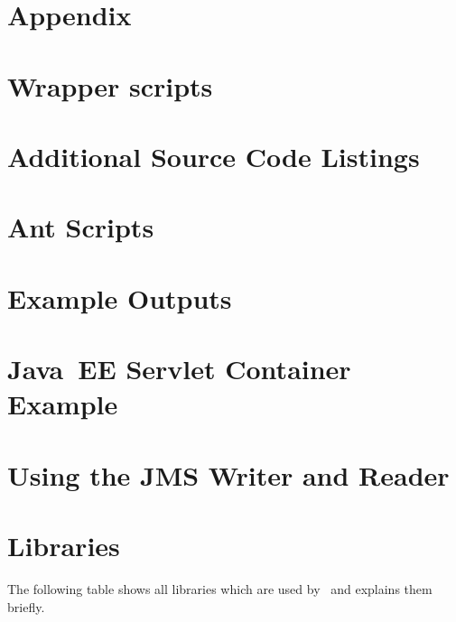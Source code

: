 % 


\appendix

\chapter*{Appendix}\label{appendix}

\chapter{Wrapper scripts}\label{appendix:wrapperScripts}


\chapter{Additional Source Code Listings}\label{appendix:additionalSourceCode}


\chapter{Ant Scripts}\label{appendix:antScripts}


\chapter{Example \KiekerTraceAnalysis{} Outputs}\label{appendix:traceAnalysisOutputExamples}


\chapter{Java~EE Servlet Container Example}\label{appendix:JavaEEServletExample}


\chapter{Using the JMS Writer and Reader}\label{appendix:usingJMS}


\chapter{Libraries}\label{appendix:libraries}
    The following table shows all libraries which are used by \Kieker\ and explains them briefly.
    

